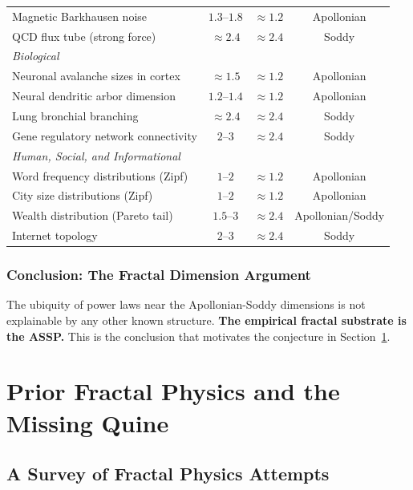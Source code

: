\documentclass[11pt,a4paper]{article}
\begin{document}
\begin{longtable}{p{6.8cm}ccc}
Magnetic Barkhausen noise & $1.3$--$1.8$ & $\approx1.2$ & Apollonian \\
QCD flux tube (strong force) & $\approx2.4$ & $\approx2.4$ & Soddy \\
\midrule
\multicolumn{4}{l}{\textit{Biological}} \\
\midrule
Neuronal avalanche sizes in cortex & $\approx1.5$ & $\approx1.2$ & Apollonian \\
Neural dendritic arbor dimension & $1.2$--$1.4$ & $\approx1.2$ & Apollonian \\
Lung bronchial branching & $\approx2.4$ & $\approx2.4$ & Soddy \\
Gene regulatory network connectivity & $2$--$3$ & $\approx2.4$ & Soddy \\
\midrule
\multicolumn{4}{l}{\textit{Human, Social, and Informational}} \\
\midrule
Word frequency distributions (Zipf) & $1$--$2$ & $\approx1.2$ & Apollonian \\
City size distributions (Zipf) & $1$--$2$ & $\approx1.2$ & Apollonian \\
Wealth distribution (Pareto tail) & $1.5$--$3$ & $\approx2.4$ & Apollonian/Soddy \\
Internet topology & $2$--$3$ & $\approx2.4$ & Soddy \\
\end{longtable}

\subsubsection{Conclusion: The Fractal Dimension Argument}

The ubiquity of power laws near the Apollonian-Soddy dimensions is not explainable
by any other known structure. \textbf{The empirical fractal substrate is the ASSP.}
This is the conclusion that motivates the conjecture in Section~\ref{sec:conjecture}.


\section{Prior Fractal Physics and the Missing Quine}
\label{sec:conjecture}

\subsection{A Survey of Fractal Physics Attempts}
\end{document}
